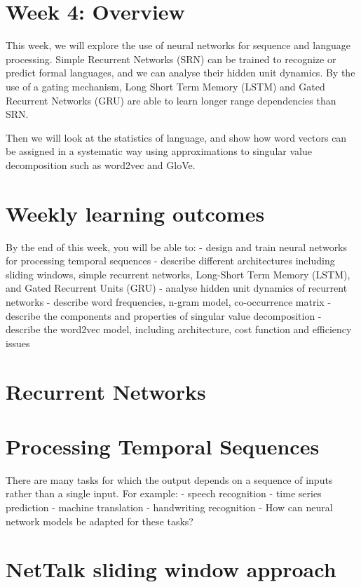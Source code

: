 \documentclass[11pt]{article}
\begin{document}
\section{Week 4: Overview}\label{sec:week-4:-overview}

    This week, we will explore the use of neural networks for sequence and language processing.
Simple Recurrent Networks (SRN) can be trained to recognize or predict formal languages, and we can analyse their hidden unit dynamics.
By the use of a gating mechanism, Long Short Term Memory (LSTM) and Gated Recurrent Networks (GRU) are able to learn longer range dependencies than SRN.

Then we will look at the statistics of language, and show how word vectors can be assigned in a systematic way using approximations to singular value decomposition such as word2vec and GloVe.

\section{Weekly learning outcomes}\label{sec:weekly-learning-outcomes}

By the end of this week, you will be able to:
- design and train neural networks for processing temporal sequences
- describe different architectures including sliding windows, simple recurrent networks, Long-Short Term Memory (LSTM), and Gated Recurrent Units (GRU)
- analyse hidden unit dynamics of recurrent networks
- describe word frequencies, n-gram model, co-occurrence matrix
- describe the components and properties of singular value decomposition
- describe the word2vec model, including architecture, cost function and efficiency issues

\section{Recurrent Networks}
\section{Processing Temporal Sequences}

There are many tasks for which the output depends on a sequence of inputs rather than a single input.
For example:
- speech recognition
- time series prediction
- machine translation
- handwriting recognition
- How can neural network models be adapted for these tasks?

\section{NetTalk sliding window approach}
\end{document}
